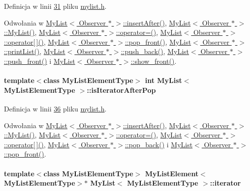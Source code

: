 Definicja w linii \hyperlink{mylist_8h_source_l00031}{31} pliku \hyperlink{mylist_8h_source}{mylist.\-h}.



Odwołania w \hyperlink{mylist_8h_source_l00212}{My\-List$<$ Observer $\ast$ $>$\-::insert\-After()}, \hyperlink{mylist_8h_source_l00039}{My\-List$<$ Observer $\ast$ $>$\-::\-My\-List()}, \hyperlink{mylist_8h_source_l00234}{My\-List$<$ Observer $\ast$ $>$\-::operator=()}, \hyperlink{mylist_8h_source_l00171}{My\-List$<$ Observer $\ast$ $>$\-::operator\mbox{[}$\,$\mbox{]}()}, \hyperlink{mylist_8h_source_l00098}{My\-List$<$ Observer $\ast$ $>$\-::pop\-\_\-front()}, \hyperlink{mylist_8h_source_l00156}{My\-List$<$ Observer $\ast$ $>$\-::print\-List()}, \hyperlink{mylist_8h_source_l00112}{My\-List$<$ Observer $\ast$ $>$\-::push\-\_\-back()}, \hyperlink{mylist_8h_source_l00125}{My\-List$<$ Observer $\ast$ $>$\-::push\-\_\-front()} i \hyperlink{mylist_8h_source_l00139}{My\-List$<$ Observer $\ast$ $>$\-::show\-\_\-front()}.

\hypertarget{class_my_list_a1041f18464ae98367844d13aa2e7b5a6}{
\paragraph[{is\-Iterator\-After\-Pop}]{\setlength{\rightskip}{0pt plus 5cm}template$<$class My\-List\-Element\-Type$>$ int {\bf My\-List}$<$ My\-List\-Element\-Type $>$\-::is\-Iterator\-After\-Pop}}\label{class_my_list_a1041f18464ae98367844d13aa2e7b5a6}


Definicja w linii \hyperlink{mylist_8h_source_l00036}{36} pliku \hyperlink{mylist_8h_source}{mylist.\-h}.



Odwołania w \hyperlink{mylist_8h_source_l00212}{My\-List$<$ Observer $\ast$ $>$\-::insert\-After()}, \hyperlink{mylist_8h_source_l00039}{My\-List$<$ Observer $\ast$ $>$\-::\-My\-List()}, \hyperlink{mylist_8h_source_l00234}{My\-List$<$ Observer $\ast$ $>$\-::operator=()}, \hyperlink{mylist_8h_source_l00171}{My\-List$<$ Observer $\ast$ $>$\-::operator\mbox{[}$\,$\mbox{]}()}, \hyperlink{mylist_8h_source_l00084}{My\-List$<$ Observer $\ast$ $>$\-::pop\-\_\-back()} i \hyperlink{mylist_8h_source_l00098}{My\-List$<$ Observer $\ast$ $>$\-::pop\-\_\-front()}.

\hypertarget{class_my_list_aecf059ed6926a3d6eb82641d46a3e3ff}{
\paragraph[{iterator}]{\setlength{\rightskip}{0pt plus 5cm}template$<$class My\-List\-Element\-Type$>$ {\bf My\-List\-Element}$<$My\-List\-Element\-Type$>$$\ast$ {\bf My\-List}$<$ My\-List\-Element\-Type $>$\-::iterator}}\label{class_my_list_aecf059ed6926a3d6eb82641d46a3e3ff}


